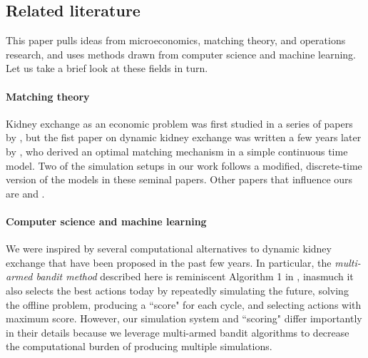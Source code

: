 \documentclass[format=acmsmall, review=false]{acmart}
\begin{document}
\subsection{Related literature} This paper pulls ideas from microeconomics, matching theory, and operations research, and uses methods drawn from computer science and machine learning. Let us take a brief look at these fields in turn. 

\paragraph{Matching theory} Kidney exchange as an economic problem was first studied in a series of papers by \citet{roth2004kidney, roth2005pairwise, roth2007efficient}, but the fist paper on dynamic kidney exchange was written a few years later by \citet{unver2010dynamic}, who derived an optimal matching mechanism in a simple continuous time model. Two of the simulation setups in our work follows a modified, discrete-time version of the models in these seminal papers. Other papers that influence ours are \citet{akbarpour2017thickness} and \citet{ashlagi2013kidney}.


\paragraph{Computer science and machine learning} We were inspired by several computational alternatives to dynamic kidney exchange that have been proposed in the past few years. In particular, the \emph{multi-armed bandit method} described here is reminiscent Algorithm 1 in \citet{awasthi2009online}, inasmuch it also selects the best actions today by repeatedly simulating the future, solving the offline problem, producing a ``score" for each cycle, and selecting actions with maximum score. However, our simulation system and ``scoring" differ importantly in their details because we leverage multi-armed bandit algorithms to decrease the computational burden of producing multiple simulations. 
\end{document}
